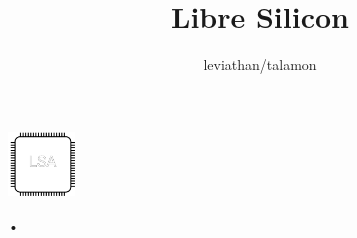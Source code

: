 \documentclass[9pt]{beamer}
\author{leviathan/talamon}
\title{Libre Silicon}
\begin{document}
\begin{frame}
\titlepage
\begin{center}
\includegraphics[width=50pt,height=50pt]{lsa.png}
\end{center}
\end{frame}


\begin{frame}{•}

\end{frame}
\end{document}
